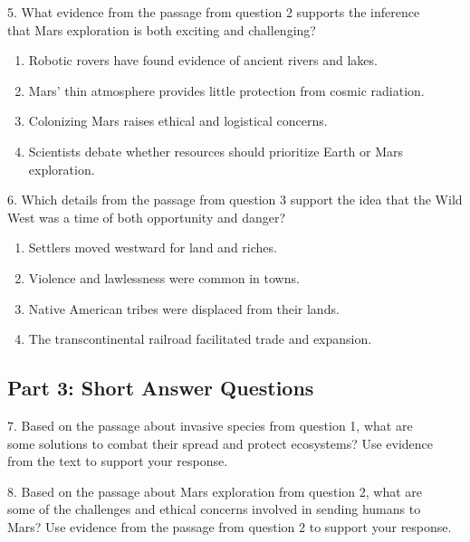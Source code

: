 \documentclass[12pt]{article}
\begin{document}
\vspace{1cm}

5. What evidence from the passage from question 2 supports the inference \\that Mars exploration is both exciting and challenging?  
\begin{enumerate}[label=\Alph*.]
    \item Robotic rovers have found evidence of ancient rivers and lakes.  
    \item Mars’ thin atmosphere provides little protection from cosmic radiation.  
    \item Colonizing Mars raises ethical and logistical concerns.  
    \item Scientists debate whether resources should prioritize Earth or Mars exploration.  
\end{enumerate}



\vspace{1cm}

6. Which details from the passage from question 3 support the idea that the Wild West was a time of both opportunity and danger?  
\begin{enumerate}[label=\Alph*.]
    \item Settlers moved westward for land and riches.  
    \item Violence and lawlessness were common in towns.  
    \item Native American tribes were displaced from their lands.  
    \item The transcontinental railroad facilitated trade and expansion.  
\end{enumerate}





\subsection*{Part 3: Short Answer Questions}

7. Based on the passage about invasive species from question 1, what are \\some solutions to combat their spread and protect ecosystems? Use evidence \\from the text to support your response.  
\vspace{4cm}

8. Based on the passage about Mars exploration from question 2, what are \\some of the challenges and ethical concerns involved in sending humans to \\Mars? Use evidence from the passage from question 2 to support your response.  
\end{document}
